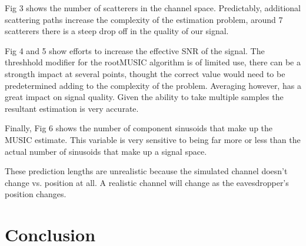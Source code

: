 \documentclass{allertonproc}
\begin{document}
 Fig 3 shows the number of scatterers in the channel space. Predictably, additional scattering paths increase the complexity of the estimation problem, around 7 scatterers there is a  steep drop off in the quality of our signal. 

Fig 4 and 5 show efforts to increase the effective SNR of the signal. The threshhold modifier for the rootMUSIC algorithm is of limited use, there can be a strongth impact at several points, thought the correct value would need to be predetermined adding to the complexity of the problem. Averaging however, has a great impact on signal quality. Given the ability to take multiple samples the resultant estimation is very accurate. 

Finally, Fig 6 shows the number of component sinusoids that make up the MUSIC estimate. This variable is very sensitive to being far more or less than the actual number of sinusoids that make up a signal space. %


These prediction lengths are unrealistic because the simulated channel doesn't change vs. position at all.  A realistic channel will change as the eavesdropper's position changes. 

\section{Conclusion}


{}
\end{document}
